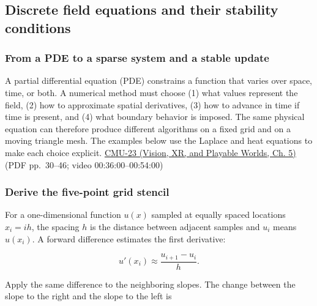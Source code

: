 \subsection{Discrete field equations and their stability conditions}\label{04-visual-computing-ii-ch030-discrete-field-equations-and-their-stability-conditions}

\hypertarget{04-visual-computing-ii-ch030-discrete-field-equations-and-their-stability-conditions}{}

\subsubsection{From a PDE to a sparse system and a stable update}\label{04-visual-computing-ii-ch030-from-a-pde-to-a-sparse-system-and-a-stable-update}

\hypertarget{04-visual-computing-ii-ch030-from-a-pde-to-a-sparse-system-and-a-stable-update}{}

A partial differential equation (PDE) constrains a function that varies over space, time, or both. A numerical method must choose (1) what values represent the field, (2) how to approximate spatial derivatives, (3) how to advance in time if time is present, and (4) what boundary behavior is imposed. The same physical equation can therefore produce different algorithms on a fixed grid and on a moving triangle mesh. The examples below use the Laplace and heat equations to make each choice explicit. \href{../07-Vision-XR-and-Playable-Worlds/main.pdf\#nameddest=04-visual-computing-ii-ch036-cmu-23---physically-based-animation-and-pdes}{CMU-23 (Vision, XR, and Playable Worlds, Ch. 5)} (PDF pp.~30--46; video 00:36:00--00:54:00)

\subsubsection{Derive the five-point grid stencil}\label{04-visual-computing-ii-ch030-derive-the-five-point-grid-stencil}

\hypertarget{04-visual-computing-ii-ch030-derive-the-five-point-grid-stencil}{}

For a one-dimensional function \(u(x)\) sampled at equally spaced locations \(x_i=ih\), the spacing \(h\) is the distance between adjacent samples and \(u_i\) means \(u(x_i)\). A forward difference estimates the first derivative:

\[
u'(x_i)\approx\frac{u_{i+1}-u_i}{h}.
\]

Apply the same difference to the neighboring slopes. The change between the slope to the right and the slope to the left is

